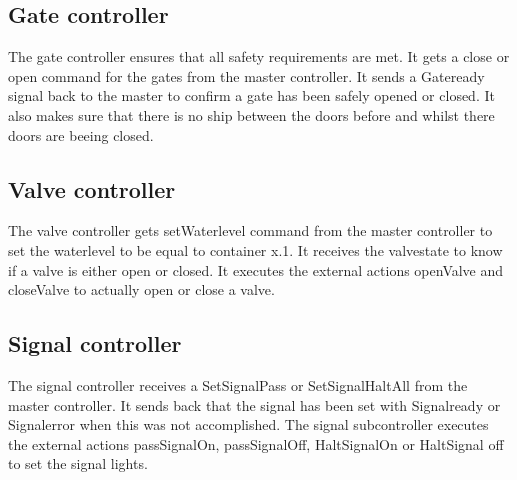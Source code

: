 \subsection{Gate controller}
The gate controller ensures that all safety requirements are met. It gets a close or open command for the gates from the master controller. It sends a Gateready signal back to the master to confirm a gate has been safely opened or closed. It also makes sure that there is no ship between the doors before and whilst there doors are beeing closed.
\subsection{Valve controller}
The valve controller gets setWaterlevel command from the master controller to set the waterlevel to be equal to container x.1. It receives the valvestate to know if a valve is either open or closed. It executes the external actions openValve and closeValve to actually open or close a valve.
\subsection{Signal controller}
The signal controller receives a SetSignalPass or SetSignalHaltAll from the master controller. It sends back that the signal has been set with Signalready or Signalerror when this was not accomplished. The signal subcontroller executes the external actions passSignalOn, passSignalOff, HaltSignalOn or HaltSignal off to set the signal lights. 